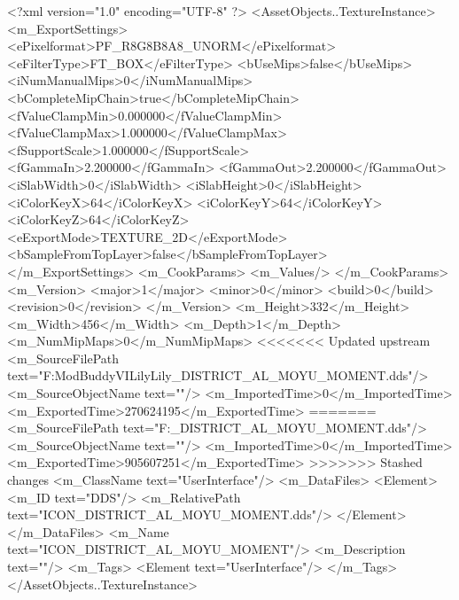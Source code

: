 <?xml version="1.0" encoding="UTF-8" ?>
<AssetObjects..TextureInstance>
	<m_ExportSettings>
		<ePixelformat>PF_R8G8B8A8_UNORM</ePixelformat>
		<eFilterType>FT_BOX</eFilterType>
		<bUseMips>false</bUseMips>
		<iNumManualMips>0</iNumManualMips>
		<bCompleteMipChain>true</bCompleteMipChain>
		<fValueClampMin>0.000000</fValueClampMin>
		<fValueClampMax>1.000000</fValueClampMax>
		<fSupportScale>1.000000</fSupportScale>
		<fGammaIn>2.200000</fGammaIn>
		<fGammaOut>2.200000</fGammaOut>
		<iSlabWidth>0</iSlabWidth>
		<iSlabHeight>0</iSlabHeight>
		<iColorKeyX>64</iColorKeyX>
		<iColorKeyY>64</iColorKeyY>
		<iColorKeyZ>64</iColorKeyZ>
		<eExportMode>TEXTURE_2D</eExportMode>
		<bSampleFromTopLayer>false</bSampleFromTopLayer>
	</m_ExportSettings>
	<m_CookParams>
		<m_Values/>
	</m_CookParams>
	<m_Version>
		<major>1</major>
		<minor>0</minor>
		<build>0</build>
		<revision>0</revision>
	</m_Version>
	<m_Height>332</m_Height>
	<m_Width>456</m_Width>
	<m_Depth>1</m_Depth>
	<m_NumMipMaps>0</m_NumMipMaps>
<<<<<<< Updated upstream
	<m_SourceFilePath text="F:\1\Firaxis ModBuddy\Civilization VI\Assault Lily\Assault Lily\Textures\ICON_DISTRICT_AL_MOYU_MOMENT.dds"/>
	<m_SourceObjectName text=""/>
	<m_ImportedTime>0</m_ImportedTime>
	<m_ExportedTime>270624195</m_ExportedTime>
=======
	<m_SourceFilePath text="F:\DT\lilyimages\all\ICON_DISTRICT_AL_MOYU_MOMENT.dds"/>
	<m_SourceObjectName text=""/>
	<m_ImportedTime>0</m_ImportedTime>
	<m_ExportedTime>905607251</m_ExportedTime>
>>>>>>> Stashed changes
	<m_ClassName text="UserInterface"/>
	<m_DataFiles>
		<Element>
			<m_ID text="DDS"/>
			<m_RelativePath text="ICON_DISTRICT_AL_MOYU_MOMENT.dds"/>
		</Element>
	</m_DataFiles>
	<m_Name text="ICON_DISTRICT_AL_MOYU_MOMENT"/>
	<m_Description text=""/>
	<m_Tags>
		<Element text="UserInterface"/>
	</m_Tags>
</AssetObjects..TextureInstance>

